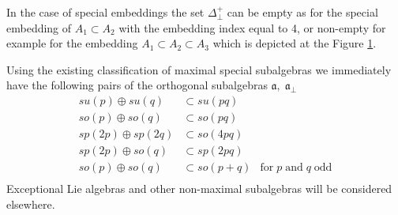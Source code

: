 \documentclass[a4paper,12pt]{article}
\theoremstyle{definition} \newtheorem{Def}{Definition}
\begin{document}
In the case of special embeddings the set $\Delta^{+}_{\bot}$ can be empty as for the
special embedding of $A_1\subset A_2$ with the embedding index equal to 4, or non-empty for example for the embedding $A_1\subset A_2\subset A_3$ which is depicted at the Figure \ref{fig:a1a2a3}. 
\begin{figure}[ph]
\noindent  {}
  \label{fig:a1a2a3}
\end{figure}

Using the existing classification of maximal special subalgebras \cite{dynkin1952semisimple} we immediately have the following pairs of the orthogonal subalgebras $\mathfrak{a},\;\mathfrak{a}_{\bot}$
\begin{equation}
  \label{eq:42}
  \begin{array}{lll}
      su(p)\oplus su(q) & \subset su(pq) &\\
      so(p)\oplus so(q) & \subset so(pq) &\\
      sp(2p)\oplus sp(2q) & \subset so(4pq)&\\
      sp(2p)\oplus so(q) & \subset sp(2pq)&\\
      so(p)\oplus so(q) & \subset so(p+q)& \text{for}\;p\;\text{and}\;q\;\text{odd}\\
  \end{array}
\end{equation}
Exceptional Lie algebras and other non-maximal subalgebras will be considered elsewhere.
\end{document}
